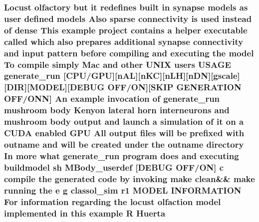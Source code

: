 \hypertarget{userproject_2MBody__userdef__project_2README_8txt_a85d00e8dfaf1bdfcd9e278d0560f8acb}{
\subsubsection[{Huerta}]{\setlength{\rightskip}{0pt plus 5cm}Locust olfactory but {\bf it} redefines built {\bf in} synapse models as user defined models Also sparse connectivity {\bf is} used instead of dense This example {\bf project} contains a helper executable called which also prepares additional synapse connectivity and input pattern before compiling and executing the {\bf model} To compile simply Mac and other U\+N\+I\+X users U\+S\+A\+G\+E {\bf generate\+\_\+run} \mbox{[}{\bf C\+P\+U}/{\bf G\+P\+U}\mbox{]}\mbox{[}n\+A\+L\mbox{]}\mbox{[}n\+K\+C\mbox{]}\mbox{[}n\+L\+H\mbox{]}\mbox{[}n\+D\+N\mbox{]}\mbox{[}gscale\mbox{]}\mbox{[}D\+I\+R\mbox{]}\mbox{[}M\+O\+D\+E\+L\mbox{]}\mbox{[}D\+E\+B\+U\+G O\+F\+F/O\+N\mbox{]}\mbox{[}S\+K\+I\+P G\+E\+N\+E\+R\+A\+T\+I\+O\+N O\+F\+F/O\+N\+N\mbox{]} An example invocation of {\bf generate\+\_\+run} mushroom body Kenyon lateral horn {\bf interneurons} and mushroom body output and launch a simulation of {\bf it} on a C\+U\+D\+A enabled {\bf G\+P\+U} All output files will be prefixed {\bf with} outname and will be created under the outname {\bf directory} In more what {\bf generate\+\_\+run} program does and executing buildmodel sh M\+Body\+\_\+userdef \mbox{[}D\+E\+B\+U\+G O\+F\+F/O\+N\mbox{]} c compile the generated {\bf code} by invoking make clean\&\& make running the e g classol\+\_\+sim r1 M\+O\+D\+E\+L I\+N\+F\+O\+R\+M\+A\+T\+I\+O\+N For information regarding the locust olfaction {\bf model} implemented {\bf in} this example {\bf R} Huerta}}\label{userproject_2MBody__userdef__project_2README_8txt_a85d00e8dfaf1bdfcd9e278d0560f8acb}
